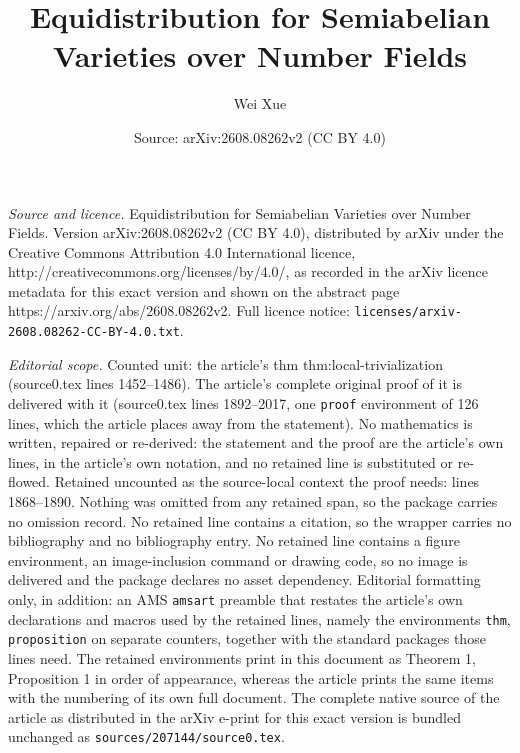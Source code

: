 \documentclass[10pt,a4paper]{amsart}
\title{Equidistribution for Semiabelian Varieties over Number Fields}
\author{Wei Xue}
\date{Source: arXiv:2608.08262v2 (CC BY 4.0)}
\begin{document}
\maketitle

\noindent\emph{Source and licence.} Equidistribution for Semiabelian Varieties over Number Fields. Version arXiv:2608.08262v2 (CC BY 4.0), distributed by arXiv under the Creative Commons Attribution 4.0 International licence, http://creativecommons.org/licenses/by/4.0/, as recorded in the arXiv licence metadata for this exact version and shown on the abstract page https://arxiv.org/abs/2608.08262v2. Full licence notice: \texttt{licenses/arxiv-2608.08262-CC-BY-4.0.txt}.\par\smallskip

\noindent\textit{Editorial scope.} Counted unit: the article's thm thm:local-trivialization (source0.tex lines 1452--1486). The article's complete original proof of it is delivered with it (source0.tex lines 1892--2017, one \texttt{proof} environment of 126 lines, which the article places away from the statement). No mathematics is written, repaired or re-derived: the statement and the proof are the article's own lines, in the article's own notation, and no retained line is substituted or re-flowed.  Retained uncounted as the source-local context the proof needs: lines 1868--1890.  Nothing was omitted from any retained span, so the package carries no omission record.  No retained line contains a citation, so the wrapper carries no bibliography and no bibliography entry.  No retained line contains a figure environment, an image-inclusion command or drawing code, so no image is delivered and the package declares no asset dependency.  Editorial formatting only, in addition: an AMS \texttt{amsart} preamble that restates the article's own declarations and macros used by the retained lines, namely the environments \texttt{thm}, \texttt{proposition} on separate counters, together with the standard packages those lines need.  The retained environments print in this document as Theorem 1, Proposition 1 in order of appearance, whereas the article prints the same items with the numbering of its own full document.  The complete native source of the article as distributed in the arXiv e-print for this exact version is bundled unchanged as \texttt{sources/207144/source0.tex}.
\end{document}
